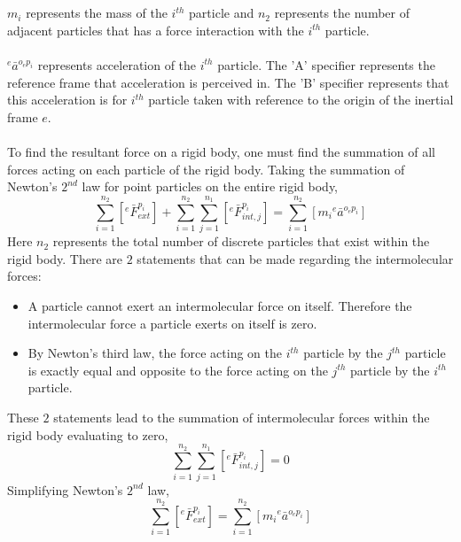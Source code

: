 \documentclass[class=report, 12pt, crop=false]{standalone}
\begin{document}
\begin{center}
\\~\\$m_{i}$ represents the mass of the $i^{th}$ particle and $n_{2}$ represents the number of adjacent particles that has a force interaction with the $i^{th}$ particle.
\\~\\${}^{e}\bar{a}^{o_{e}p_{i}}$ represents acceleration of the $i^{th}$ particle. The 'A' specifier represents the reference frame that acceleration is perceived in. The 'B' specifier represents that this acceleration is for $i^{th}$ particle taken with reference to the origin of the inertial frame $e$.
\\~\\To find the resultant force on a rigid body, one must find the summation of all forces acting on each particle of the rigid body. Taking the summation of Newton's $2^{nd}$ law for point particles on the entire rigid body,
$$\sum^{n_{2}}_{i = 1}\left[{}^{e}\bar{F}^{p_{i}}_{ext}\right] + \sum^{n_{2}}_{i = 1}\sum^{n_{1}}_{j = 1}\left[{}^{e}\bar{F}^{p_{i}}_{int,j}\right] = \sum^{n_{2}}_{i = 1}\left[m_{i}{}^{e}\bar{a}^{o_{e}p_{i}}\right]$$
Here $n_{2}$ represents the total number of discrete particles that exist within the rigid body. There are $2$ statements that can be made regarding the intermolecular forces:
\begin{itemize}
    \item A particle cannot exert an intermolecular force on itself. Therefore the intermolecular force a particle exerts on itself is zero.
    \item By Newton's third law, the force acting on the $i^{th}$ particle by the $j^{th}$ particle is exactly equal and opposite to the force acting on the $j^{th}$ particle by the $i^{th}$ particle.
\end{itemize}
These $2$ statements lead to the summation of intermolecular forces within the rigid body evaluating to zero,
$$\sum^{n_{2}}_{i = 1}\sum^{n_{1}}_{j = 1}\left[{}^{e}\bar{F}^{p_{i}}_{int,j}\right] = 0$$
Simplifying Newton's $2^{nd}$ law,
\begin{equation}\sum^{n_{2}}_{i = 1}\left[{}^{e}\bar{F}^{p_{i}}_{ext}\right] = \sum^{n_{2}}_{i = 1}\left[m_{i}{}^{e}\bar{a}^{o_{e}p_{i}}\right]\label{mambah-1}\end{equation}


\end{center}
\end{document}
